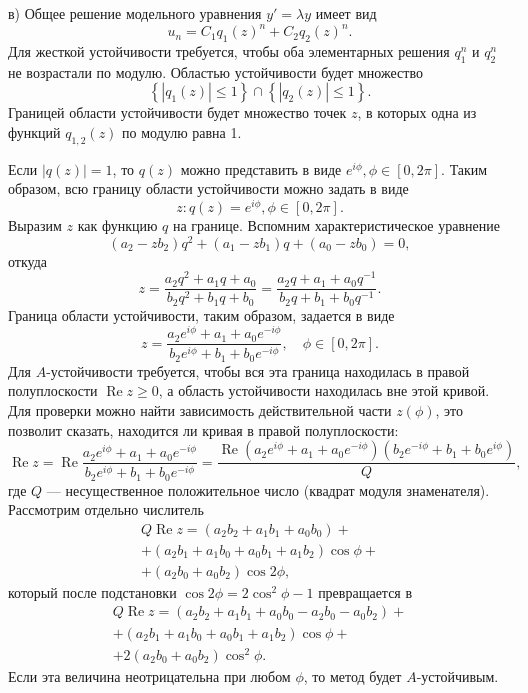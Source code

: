\documentclass[12pt]{article}
\begin{document}
в) Общее решение модельного уравнения $y' = \lambda y$ имеет вид
\[
u_n = C_1 q_1(z)^n + C_2 q_2(z)^n.
\]
Для жесткой устойчивости требуется, чтобы оба элементарных решения $q_1^n$ и $q_2^n$ не возрастали по модулю. Областью устойчивости будет множество
\[
\left\{|q_1(z)| \leqslant 1\right\} \cap
\left\{|q_2(z)| \leqslant 1\right\}.
\]
Границей области устойчивости будет множество точек $z$, в которых одна из функций $q_{1,2}(z)$ по модулю равна 1.

Если $|q(z)| = 1$, то $q(z)$ можно представить в виде $e^{i \phi}, \phi \in [0, 2\pi]$. Таким образом, всю границу области устойчивости можно задать в виде
\[
z : q(z) = e^{i\phi}, \phi \in [0,2\pi].
\]
Выразим $z$ как функцию $q$ на границе. Вспомним характеристическое уравнение
\[
(a_2 - z b_2) q^2 + (a_1 - z b_1) q + (a_0 - z b_0) = 0,
\]
откуда
\[
z = \frac{a_2 q^2 + a_1 q + a_0}{b_2 q^2 + b_1 q + b_0} = 
\frac{a_2 q + a_1 + a_0 q^{-1}}{b_2 q + b_1 + b_0 q^{-1}}.
\] 
Граница области устойчивости, таким образом, задается в виде
\[
z = \frac{a_2 e^{i\phi} + a_1 + a_0 e^{-i\phi}}{b_2 e^{i\phi} + b_1 + b_0 e^{-i\phi}}, \quad \phi \in [0,2\pi].
\]
Для $A$-устойчивости требуется, чтобы вся эта граница находилась в правой полуплоскости $\operatorname{Re} z \geqslant 0$, а область устойчивости находилась вне этой кривой.
Для проверки можно найти зависимость действительной части $z(\phi)$, это позволит сказать, находится ли кривая в правой полуплоскости:
\[
\operatorname{Re} z = \operatorname{Re} \frac{a_2 e^{i\phi} + a_1 + a_0 e^{-i\phi}}{b_2 e^{i\phi} + b_1 + b_0 e^{-i\phi}} = 
\frac{\operatorname{Re} (a_2 e^{i\phi} + a_1 + a_0 e^{-i\phi})(b_2 e^{-i\phi} + b_1 + b_0 e^{i\phi})}{Q},
\]
где $Q$ --- несущественное положительное число (квадрат модуля знаменателя). 
Рассмотрим отдельно числитель
\begin{multline*}
Q \operatorname{Re} z = (a_2 b_2 + a_1 b_1 + a_0 b_0) + \\ + (a_2 b_1 + a_1 b_0 + a_0 b_1 + a_1 b_2) \cos \phi + \\ + (a_2 b_0 + a_0 b_2) \cos 2 \phi,
\end{multline*}
который после подстановки $\cos 2\phi = 2\cos^2 \phi - 1$ превращается в
\begin{multline*}
Q \operatorname{Re} z = (a_2 b_2 + a_1 b_1 + a_0 b_0 - a_2 b_0 - a_0 b_2) + \\ + (a_2 b_1 + a_1 b_0 + a_0 b_1 + a_1 b_2) \cos \phi + \\ + 2(a_2 b_0 + a_0 b_2) \cos^2 \phi.
\end{multline*}
Если эта величина неотрицательна при любом $\phi$, то метод будет $A$-устойчивым.
\end{document}
